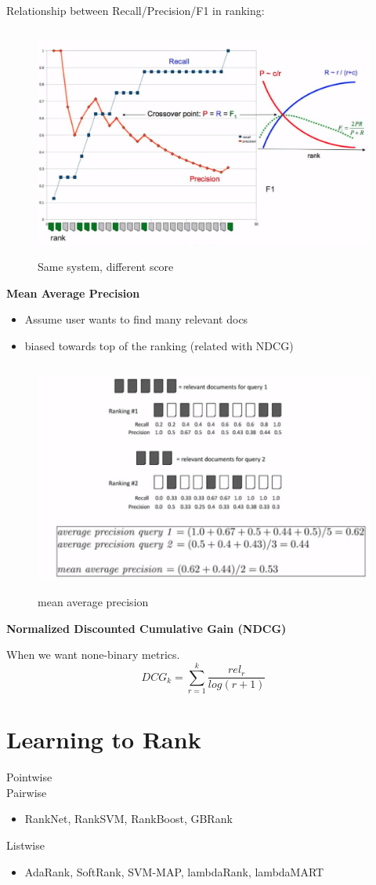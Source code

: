 \documentclass{article}
\begin{document}
Relationship between Recall/Precision/F1 in ranking:
\begin{figure}[H]
\centering
\includegraphics[width=4.5in,height=3in]{rank1}
\caption{Same system, different score}
\end{figure}

\textbf{Mean Average Precision}
\begin{itemize}
\item Assume user wants to find many relevant docs
\item biased towards top of the ranking (related with NDCG)
\end{itemize}
\begin{figure}[H]
\centering
\includegraphics[width=5in,height=3in]{map}
\caption{mean average precision}
\end{figure}

\textbf{Normalized Discounted Cumulative Gain (NDCG)}

When we want none-binary metrics.
$$DCG_{k}=\sum_{r=1}^{k}\frac{rel_{r}}{log(r+1)}$$

\section{Learning to Rank}
\noindent
Pointwise
\\
Pairwise
\begin{itemize}
\item RankNet, RankSVM, RankBoost, GBRank
\end{itemize}
Listwise
\begin{itemize}
\item AdaRank, SoftRank, SVM-MAP, lambdaRank, lambdaMART
\end{itemize}
\end{document}
